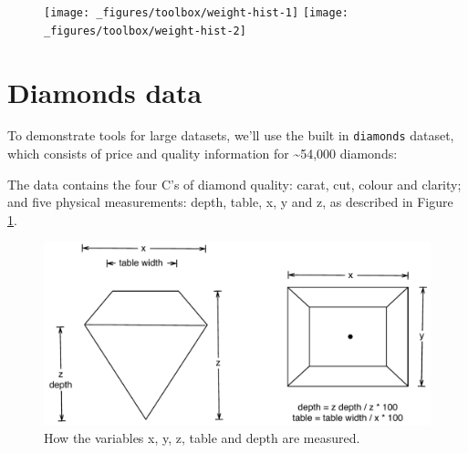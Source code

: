 \begin{figure}[H]
  \texttt{[image: \_figures/toolbox/weight-hist-1]}%
  \texttt{[image: \_figures/toolbox/weight-hist-2]}
\end{figure}

\hypertarget{sec:diamonds}{\section{Diamonds data}\label{sec:diamonds}}

To demonstrate tools for large datasets, we'll use the built in
\texttt{diamonds} dataset, which consists of price and quality
information for \textasciitilde{}54,000 diamonds:

\begin{Shaded}
\begin{Highlighting}[]
\CommentTok{#> }
\end{Highlighting}
\end{Shaded}

The data contains the four C's of diamond quality: carat, cut, colour
and clarity; and five physical measurements: depth, table, x, y and z,
as described in Figure \ref{fig:diamond-dim}.

\begin{figure}[htbp]
  \centering
    \includegraphics[width=0.8\linewidth]{diagrams/diamond-dimensions}
  \caption{How the variables x, y, z, table and depth are measured.}
  \label{fig:diamond-dim}
\end{figure}

